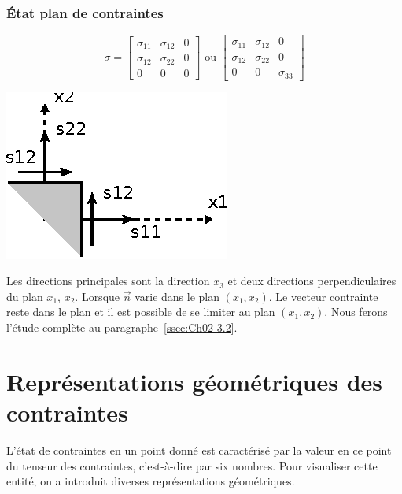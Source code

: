 \subsubsection{État plan de contraintes}
\begin{equation}
    \mathbb{\sigma} = 
    \begin{bmatrix}
        \sigma_{11} & \sigma_{12} & 0 \\
        \sigma_{12} & \sigma_{22} & 0 \\
        0 & 0 & 0
    \end{bmatrix}
    \text{ ou }
    \begin{bmatrix}
        \sigma_{11} & \sigma_{12} & 0 \\
        \sigma_{12} & \sigma_{22} & 0 \\
        0 & 0 & \sigma_{33}
    \end{bmatrix}
    \label{eq:Ch02-022}
\end{equation}
\begin{minipage}[l]{.3\textwidth}
    \begin{center}
        \includegraphics{../images/T1_Ch02-0010}
    \end{center}
\end{minipage}
\begin{minipage}[r]{.7\textwidth}
Les directions principales sont la direction $x_3$ et deux directions perpendiculaires du plan $x_1$, $x_2$.
Lorsque $\vec{n}$ varie dans le plan $(x_1,x_2)$. Le vecteur contrainte reste dans le plan et il est possible de se limiter au plan $(x_1,x_2)$.
Nous ferons l'étude complète au paragraphe~\ref{ssec:Ch02-3.2}.
\end{minipage}

\section{Représentations géométriques des contraintes} \label{sec:Ch02-2}
L'état de contraintes en un point donné est caractérisé par la valeur en ce point du tenseur des contraintes, c'est-à-dire par six nombres.
Pour visualiser cette entité, on a introduit diverses représentations géométriques.
